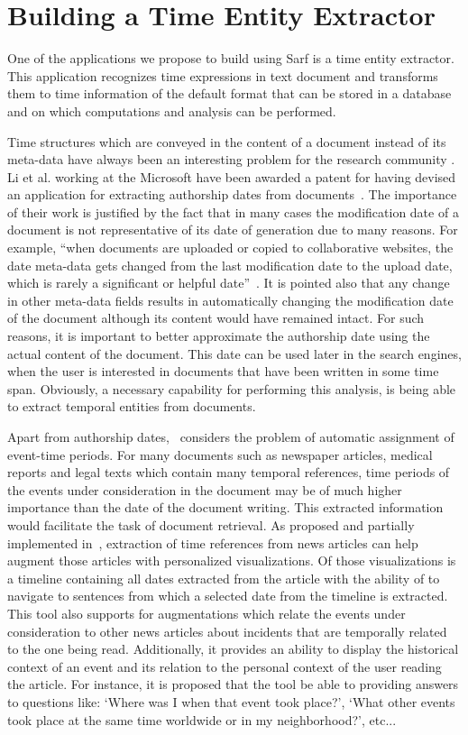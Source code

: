 \documentclass[a4,12pt]{report}
\begin{document}
\section{Building a Time Entity Extractor}

One of the applications we propose to build using Sarf is a time entity extractor. This application
recognizes time expressions in text document and transforms them to time information of the default format
that can be stored in a database and on which computations and analysis can be performed.

Time structures which are conveyed in the content of a document instead of its meta-data 
have always been an interesting problem for the research community \cite{GROSS:93,Llido:01,DSTO:05,patent:09}. 
Li et al. working at the 
Microsoft have been awarded a patent for having devised an application for extracting authorship 
dates from documents~\cite{patent:09}. The importance of their work is justified by the fact that 
in many cases the modification date of a document is not representative of its date of generation due 
to many reasons. For example, ``when documents are uploaded or copied to
collaborative websites, the date meta-data gets changed from the last modification date to the 
upload date, which is rarely a significant or helpful date''~\cite{patent:09}. It is pointed also that any change in
other meta-data fields results in automatically changing the modification date of the document although its content would have 
remained intact. For such reasons, it is important to better approximate the authorship date 
using the actual content of the document. This date can be used later in the search engines, when the user is interested 
in documents that have been written in some time span. Obviously, a necessary capability for performing this analysis, 
is being able 
to extract temporal entities from documents.

Apart from authorship dates,~\cite{Llido:01} considers the problem of automatic assignment of event-time periods.
For many documents such as newspaper articles, medical reports and legal texts which contain many temporal 
references, time periods of the events under consideration in the document may be of much higher importance than 
the date of the document writing. This extracted information would facilitate the task of document retrieval.
As proposed and partially implemented in~\cite{Koen:00}, extraction of time references from news articles can help
augment those articles with personalized visualizations. Of those visualizations is a timeline containing all dates
extracted from the article with the ability of to navigate to sentences from which a selected date from the timeline 
is extracted. This tool also supports for augmentations which relate the events under consideration to
other news articles about incidents that are temporally
related to the one being read. Additionally, it provides an ability to display the historical context of an event and its relation
to the personal context of the user reading the article. For instance, it is proposed that the tool
be able to providing answers to questions like: `Where was I when that event took place?', `What other events took place
at the same time worldwide or in my neighborhood?', etc... 
\end{document}
